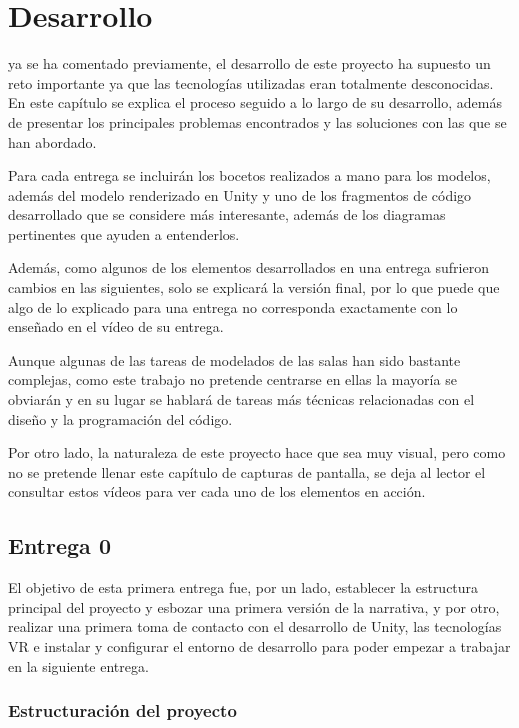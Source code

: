 \chapter{Desarrollo}
\label{chap:desarrollo}

 ya se ha comentado previamente, el desarrollo de este proyecto ha supuesto un reto importante ya que las tecnologías utilizadas eran totalmente desconocidas. En este capítulo se explica el proceso seguido a lo largo de su desarrollo, además de presentar los principales problemas encontrados y las soluciones con las que se han abordado.

Para cada entrega se incluirán los bocetos realizados a mano para los modelos, además del modelo renderizado en Unity y uno de los fragmentos de código desarrollado que se considere más interesante, además de los diagramas pertinentes que ayuden a entenderlos.

Además, como algunos de los elementos desarrollados en una entrega sufrieron cambios en las siguientes, solo se explicará la versión final, por lo que puede que algo de lo explicado para una entrega no corresponda exactamente con lo enseñado en el vídeo de su entrega.

Aunque algunas de las tareas de modelados de las salas han sido bastante complejas, como este trabajo no pretende centrarse en ellas la mayoría se obviarán y en su lugar se hablará de tareas más técnicas relacionadas con el diseño y la programación del código.

Por otro lado, la naturaleza de este proyecto hace que sea muy visual, pero como no se pretende llenar este capítulo de capturas de pantalla, se deja al lector el consultar estos vídeos para ver cada uno de los elementos en acción.

\section{Entrega 0}

El objetivo de esta primera entrega fue, por un lado, establecer la estructura principal del proyecto y esbozar una primera versión de la narrativa, y por otro, realizar una primera toma de contacto con el desarrollo de Unity, las tecnologías \acs{VR} e instalar y configurar el entorno de desarrollo para poder empezar a trabajar en la siguiente entrega.

\subsection{Estructuración del proyecto}

